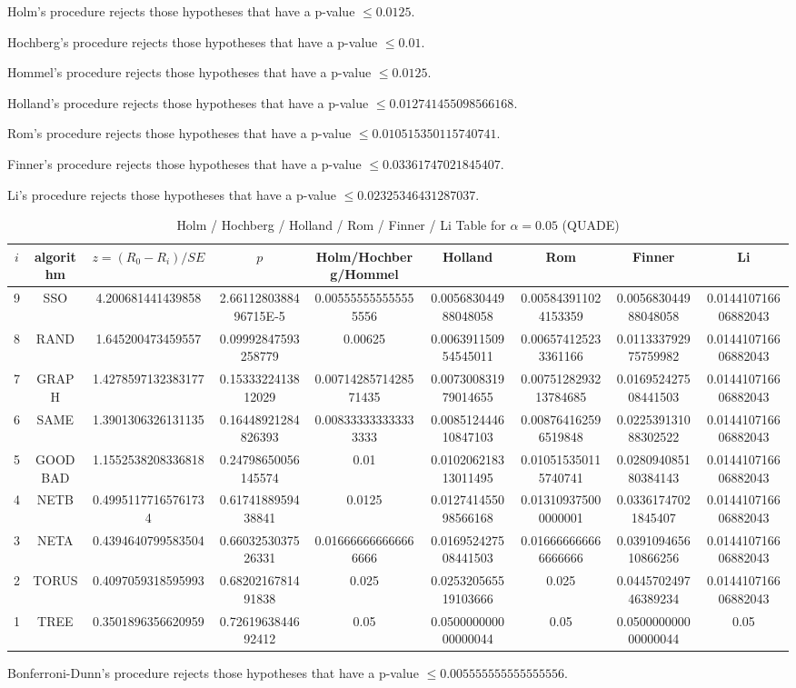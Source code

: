 \documentclass[a4paper,10pt]{article}
\begin{document}
\begin{landscape}
Holm's procedure rejects those hypotheses that have a p-value $\le0.0125$.


Hochberg's procedure rejects those hypotheses that have a p-value $\le0.01$.


Hommel's procedure rejects those hypotheses that have a p-value $\le0.0125$.


Holland's procedure rejects those hypotheses that have a p-value $\le0.012741455098566168$.


Rom's procedure rejects those hypotheses that have a p-value $\le0.010515350115740741$.


Finner's procedure rejects those hypotheses that have a p-value $\le0.03361747021845407$.


Li's procedure rejects those hypotheses that have a p-value $\le0.02325346431287037$.



\newpage

\begin{table}[!htp]
\centering\scriptsize
\caption{Holm / Hochberg / Holland / Rom / Finner / Li Table for $\alpha=0.05$ (QUADE)}
\begin{tabular}{ccccccccc}
$i$&algorithm&$z=(R_0 - R_i)/SE$&$p$&Holm/Hochberg/Hommel&Holland&Rom&Finner&Li\\
\hline
9& SSO&4.200681441439858&2.6611280388496715E-5&0.005555555555555556&0.005683044988048058&0.005843911024153359&0.005683044988048058&0.014410716606882043\\
8& RAND&1.645200473459557&0.09992847593258779&0.00625&0.006391150954545011&0.006574125233361166&0.011333792975759982&0.014410716606882043\\
7& GRAPH&1.4278597132383177&0.1533322413812029&0.0071428571428571435&0.007300831979014655&0.0075128293213784685&0.016952427508441503&0.014410716606882043\\
6& SAME&1.3901306326131135&0.16448921284826393&0.008333333333333333&0.008512444610847103&0.008764162596519848&0.022539131088302522&0.014410716606882043\\
5& GOODBAD&1.1552538208336818&0.24798650056145574&0.01&0.010206218313011495&0.010515350115740741&0.028094085180384143&0.014410716606882043\\
4& NETB&0.49951177165761734&0.6174188959438841&0.0125&0.012741455098566168&0.013109375000000001&0.03361747021845407&0.014410716606882043\\
3& NETA&0.4394640799583504&0.6603253037526331&0.016666666666666666&0.016952427508441503&0.016666666666666666&0.039109465610866256&0.014410716606882043\\
2& TORUS&0.4097059318595993&0.6820216781491838&0.025&0.025320565519103666&0.025&0.044570249746389234&0.014410716606882043\\
1& TREE&0.3501896356620959&0.7261963844692412&0.05&0.050000000000000044&0.05&0.050000000000000044&0.05\\
\hline
\end{tabular}
\end{table}
Bonferroni-Dunn's procedure rejects those hypotheses that have a p-value $\le0.005555555555555556$.



\end{landscape}
\end{document}
